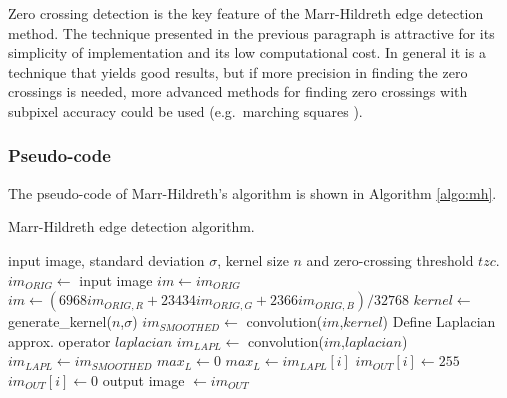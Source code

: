 \documentclass{ipol}
\numberwithin{equation}{section}
\numberwithin{table}{section}
\numberwithin{figure}{section}
\begin{document}
Zero crossing detection is the key feature of the Marr-Hildreth edge detection method. The technique 
presented in the previous paragraph is attractive for its simplicity of implementation and its low 
computational cost. In general it is a technique that yields good results, but if more precision in 
finding the zero crossings is needed, more advanced methods for finding zero crossings with subpixel 
accuracy could be used (e.g.\ marching squares \cite{marching_cubes}).


\subsubsection{Pseudo-code}

The pseudo-code of Marr-Hildreth's algorithm is shown in Algorithm \ref{algo:mh}.

\begin{algorithm}[t!]
\caption{Marr-Hildreth edge detection algorithm.}
\label{algo:mh}
\begin{algorithmic}[1]
\REQUIRE input image, standard deviation $\sigma$, kernel size $n$ and zero-crossing threshold $tzc$.
\STATE $im_{ORIG} \leftarrow$ input image
	\STATE $im \leftarrow im_{ORIG}$
\ELSE 
	\STATE $im \leftarrow (6968im_{ORIG,R}+23434im_{ORIG,G}+2366im_{ORIG,B})/32768$ 
\ENDIF
\STATE $kernel \leftarrow$ generate\_kernel($n$,$\sigma$) 
\STATE $im_{SMOOTHED} \leftarrow$ convolution($im$,$kernel$)
	\STATE Define Laplacian approx. operator $laplacian$
	\STATE $im_{LAPL} \leftarrow$ convolution($im$,$laplacian$)
\ELSE
	\STATE $im_{LAPL} \leftarrow im_{SMOOTHED}$
\ENDIF
\STATE $max_L \leftarrow 0$
		\STATE $max_L \leftarrow im_{LAPL}[i]$
	\ENDIF
\ENDFOR
{}
			\STATE $im_{OUT}[i] \leftarrow 255$
		\ELSE
			\STATE $im_{OUT}[i] \leftarrow 0$
		\ENDIF
	\ENDFOR
\ENDFOR
\RETURN output image $\leftarrow im_{OUT}$
\end{algorithmic}
\end{algorithm}

\end{document}
